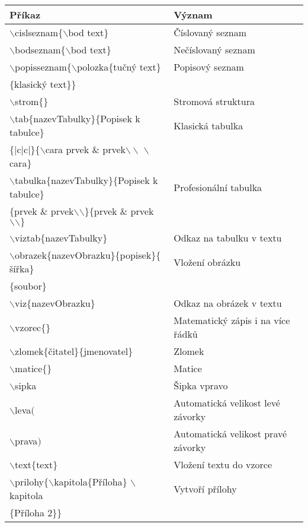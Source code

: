 \documentclass[a4paper, 12pt]{report}
\begin{document}
	\begin{table}
		\centering
		\begin{tabular}{ll}	
			\toprule[1.5pt]
			Příkaz & Význam\\
			\midrule
			$\backslash$cislseznam$\{ \backslash$bod text$\}$ & Číslovaný seznam\\
			$\backslash$bodseznam$\{ \backslash$bod text$\}$ & Nečíslovaný seznam\\
			$\backslash$popisseznam$\{ \backslash$polozka$\{$tučný text$\}$ & Popisový seznam\\
			$\{$klasický text$\}\}$\\
			$\backslash$strom$\{\}$ & Stromová struktura\\
			$\backslash$tab$\{$nazevTabulky$\}\{$Popisek k tabulce$\}$ & Klasická tabulka\\
			$\{|$c$|$c$|\}\{ \backslash$cara prvek \& prvek$\backslash \backslash$ $\backslash$cara$\}$\\
			$\backslash$tabulka$\{$nazevTabulky$\}\{$Popisek k tabulce$\}$ & Profesionální tabulka\\
			$\{$prvek \& prvek$\backslash \backslash \}$$\{$prvek \& prvek $\backslash \backslash \}$\\
			$\backslash$viztab$\{$nazevTabulky$\}$ & Odkaz na tabulku v textu\\
			$\backslash$obrazek$\{$nazevObrazku$\}\{$popisek$\}\{$šířka$\}$ & Vložení obrázku\\
			$\{$soubor$\}$\\
			$\backslash$viz$\{$nazevObrazku$\}$ & Odkaz na obrázek v textu\\
			$\backslash$vzorec$\{ \}$ & Matematický zápis i na více řádků\\
			$\backslash$zlomek$\{$čitatel$\}\{$jmenovatel$\}$ & Zlomek\\
			$\backslash$matice$\{\}$ & Matice\\
			$\backslash$sipka & Šipka vpravo\\
			$\backslash$leva$($ & Automatická velikost levé závorky\\
			$\backslash$prava$)$ & Automatická velikost pravé závorky\\
			$\backslash$text$\{$text$\}$ & Vložení textu do vzorce\\
			$\backslash$prilohy$\{\backslash$kapitola$\{$Příloha$\}$ $\backslash$kapitola & Vytvoří přílohy\\
			$\{$Příloha 2$\}\}$\\
			\bottomrule[1,5pt]
		\end{tabular}
	\end{table}
	
\end{document}
